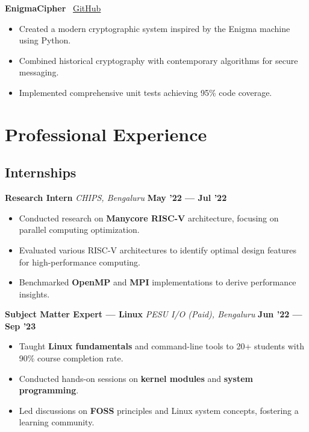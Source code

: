 \documentclass[a4paper,10pt]{article}
\begin{document}
\textbf{EnigmaCipher} \hfill \faGithub~\href{https://github.com/Adarsh-Liju/enigmacipher}{GitHub}
\begin{itemize}
    \item Created a modern cryptographic system inspired by the Enigma machine using Python.
    \item Combined historical cryptography with contemporary algorithms for secure messaging.
    \item Implemented comprehensive unit tests achieving 95\% code coverage.
\end{itemize}

\section*{Professional Experience}

\subsection*{Internships}

\textbf{Research Intern} \hfill
\textit{CHIPS, Bengaluru} \hfill \textbf{May '22 --- Jul '22}
\begin{itemize}
    \item Conducted research on \textbf{Manycore RISC-V} architecture, focusing on parallel computing optimization.
    \item Evaluated various RISC-V architectures to identify optimal design features for high-performance computing.
    \item Benchmarked \textbf{OpenMP} and \textbf{MPI} implementations to derive performance insights.
\end{itemize}

\vspace{0.5em}

\textbf{Subject Matter Expert --- Linux} \hfill
\textit{PESU I/O (Paid), Bengaluru} \hfill \textbf{Jun '22 --- Sep '23}
\begin{itemize}
    \item Taught \textbf{Linux fundamentals} and command-line tools to 20+ students with 90\% course completion rate.
    \item Conducted hands-on sessions on \textbf{kernel modules} and \textbf{system programming}.
    \item Led discussions on \textbf{FOSS} principles and Linux system concepts, fostering a learning community.
\end{itemize}
\end{document}
